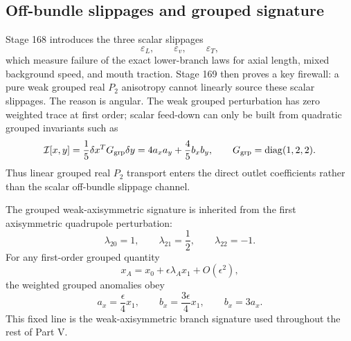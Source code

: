 \subsection{Off-bundle slippages and grouped signature}
Stage 168 introduces the three scalar slippages
\begin{equation}
\label{eq:app-part05-slippage-names}
\varepsilon_L,
\qquad
\varepsilon_v,
\qquad
\varepsilon_T,
\end{equation}
which measure failure of the exact lower-branch laws for axial length, mixed background speed, and mouth traction.  Stage 169 then proves a key firewall: a pure weak grouped real \(P_2\) anisotropy cannot linearly source these scalar slippages.  The reason is angular.  The weak grouped perturbation has zero weighted trace at first order; scalar feed-down can only be built from quadratic grouped invariants such as
\begin{equation}
\label{eq:app-part05-grouped-invariant}
\mathcal I[x,y]
=
\frac15\delta x^T G_{\rm grp}\delta y
=
4a_xa_y+\frac45 b_xb_y,
\qquad
G_{\rm grp}=\operatorname{diag}(1,2,2).
\end{equation}
Thus linear grouped real \(P_2\) transport enters the direct outlet coefficients rather than the scalar off-bundle slippage channel.

The grouped weak-axisymmetric signature is inherited from the first axisymmetric quadrupole perturbation:
\begin{equation}
\label{eq:app-part05-weak-axisymmetric-signature}
\lambda_{20}=1,
\qquad
\lambda_{21}=\frac12,
\qquad
\lambda_{22}=-1.
\end{equation}
For any first-order grouped quantity
\begin{equation}
\label{eq:app-part05-lambda-expansion-general}
x_A=x_0+\epsilon\lambda_Ax_1+O(\epsilon^2),
\end{equation}
the weighted grouped anomalies obey
\begin{equation}
\label{eq:app-part05-b-equals-3a-general}
a_x=\frac{\epsilon}{4}x_1,
\qquad
b_x=\frac{3\epsilon}{4}x_1,
\qquad
b_x=3a_x.
\end{equation}
This fixed line is the weak-axisymmetric branch signature used throughout the rest of Part V.


